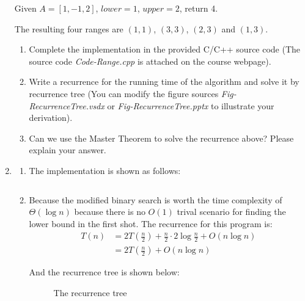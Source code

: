 \documentclass[12pt,a4paper]{article}
\makeatletter
\newtheorem*{solution}{Solution}
\theoremstyle{definition}
\renewenvironment{solution}[1][Solution] {\par\pushQED{\qed}\normalfont\topsep6\p@\@plus6\p@\relax\trivlist\item[\hskip\labelsep\bfseries#1\@addpunct{.}]\ignorespaces}{\popQED\endtrivlist\@endpefalse} \makeatother
\makeatother
\begin{document}
\begin{enumerate}
Given $A = [1,-1,2]$, $lower = 1$, $upper = 2$, return 4.

The resulting four ranges are $(1,1)$, $(3,3)$, $(2,3)$ and $(1,3)$.

\begin{enumerate}
\item
Complete the implementation in the provided C/C++ source code {\color{blue}(The source code \emph{Code-Range.cpp} is attached on the course webpage)}.
\item
Write a recurrence for the running time of the algorithm and solve it by recurrence tree {\color{blue}(You can modify the figure sources \emph{Fig-RecurrenceTree.vsdx} or \emph{Fig-RecurrenceTree.pptx} to illustrate your derivation)}.
\item
Can we use the Master Theorem to solve the recurrence above? Please explain your answer.
\end{enumerate}
\begin{solution}
\begin{enumerate}
    \item The implementation is shown as follows:
    \inputminted[]{cpp}{code/Code-Range.cpp} %
    
    \item Because the modified binary search is worth the time complexity of $\Theta(\log n)$ because there is no $O(1)$ trival scenario for finding the lower bound in the first shot. The recurrence for this program is:
    \begin{align*}
        T(n) &= 2T\left(\frac{n}{2}\right) + \frac{n}{2}\cdot 2\log \frac{n}{2} + O(n\log n)\\
        &=2T\left(\frac{n}{2}\right) + O(n\log n)
    \end{align*}

    And the recurrence tree is shown below:

    \begin{figure}[H]
        \centering
        
        \caption{The recurrence tree}
    \end{figure}


\end{enumerate}
\end{solution}
\end{enumerate}
\end{document}
